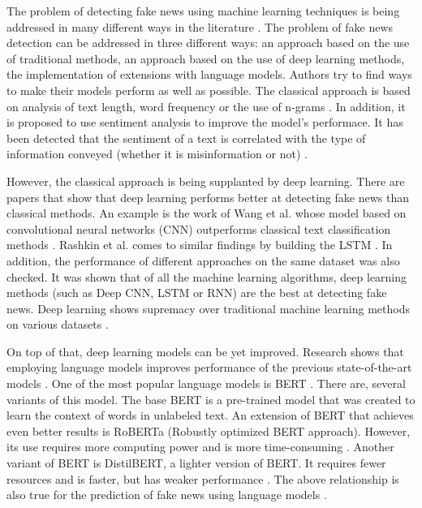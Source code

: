 The problem of detecting fake news using machine learning techniques is being addressed in many different ways in the literature \autocite{Pathak2020}. The problem of fake news detection can be addressed in three different ways: an approach based on the use of traditional methods, an approach based on the use of deep learning methods, the implementation of extensions with language models. Authors try to find ways to make their models perform as well as possible. The classical approach is based on analysis of text length, word frequency or the use of n-grams \autocite{Shu2017}. In addition, it is proposed to use sentiment analysis to improve the model's performace. It has been detected that the sentiment of a text is correlated with the type of information conveyed (whether it is misinformation or not) \autocite{rubin2016fake}.

However, the classical approach is being supplanted by deep learning. There are papers that show that deep learning performs better at detecting fake news than classical methods. An example is the work of Wang et al. whose model based on convolutional neural networks (CNN) outperforms classical text classification methods \autocite{wang-2017-liar}. Rashkin et al. comes to similar findings by building the LSTM \autocite{rashkin-etal-2017-truth}. In addition, the performance of different approaches on the same dataset was also checked. It was shown that of all the machine learning algorithms, deep learning methods (such as Deep CNN, LSTM or RNN) are the best at detecting fake news. Deep learning shows supremacy over traditional machine learning methods on various datasets \autocite{IEEE2021}. 

On top of that, deep learning models can be yet improved. Research shows that employing language models improves performance of the previous state-of-the-art models \autocite{Conroy2015}. One of the most popular language models is BERT \autocite{Devlin2018}. There are, several variants of this model. The base BERT is a pre-trained model that was created to learn the context of words in unlabeled text. An extension of BERT that achieves even better results is RoBERTa (Robustly optimized BERT approach). However, its use requires more computing power and is more time-consuming \autocite{Liu2019}. Another variant of BERT is DistilBERT, a lighter version of BERT. It requires fewer resources and is faster, but has weaker performance \autocite{Sanh2019}. The above relationship is also true for the prediction of fake news using language models \autocite{Khan2021, Joy2022}.

